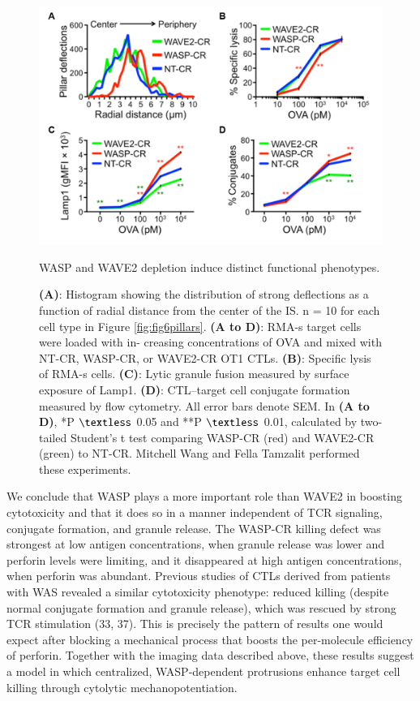 \begin{figure}[htbp]
	\centering
	\includegraphics[width=\textwidth]{../figures/chapter2/fig6crisprs.png}
	\caption{WASP and WAVE2 depletion induce distinct functional phenotypes.}
	\caption*{\textbf{(A)}: Histogram showing the distribution of strong deflections as a function of radial distance from the center of the IS. n = 10 for each cell type in Figure \ref{fig:fig6pillars}. \textbf{(A to D)}: RMA-s target cells were loaded with in- creasing concentrations of OVA and mixed with NT-CR, WASP-CR, or WAVE2-CR OT1 CTLs. \textbf{(B)}: Specific lysis of RMA-s cells. \textbf{(C)}: Lytic granule fusion measured by surface exposure of Lamp1. \textbf{(D)}: CTL–target cell conjugate formation measured by flow cytometry. All error bars denote SEM. In \textbf{(A to D)}, *P $\textless$ 0.05 and **P $\textless$ 0.01, calculated by two-tailed Student’s t test comparing WASP-CR (red) and WAVE2-CR (green) to NT-CR. Mitchell Wang and Fella Tamzalit performed these experiments.}
	\label{fig:fig6crisprs}
\end{figure}

We conclude that WASP plays a more important role than WAVE2 in boosting cytotoxicity and that it does so in a manner independent of TCR signaling, conjugate formation, and granule release. The WASP-CR killing defect was strongest at low antigen concentrations, when granule release was lower and perforin levels were limiting, and it disappeared at high antigen concentrations, when perforin was abundant. Previous studies of CTLs derived from patients with WAS revealed a similar cytotoxicity phenotype: reduced killing (despite normal conjugate formation and granule release), which was rescued by strong TCR stimulation (33, 37). This is precisely the pattern of results one would expect after blocking a mechanical process that boosts the per-molecule efficiency of perforin. Together with the imaging data described above, these results suggest a model in which centralized, WASP-dependent protrusions enhance target cell killing through cytolytic mechanopotentiation.

